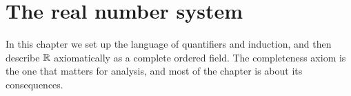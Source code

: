 \section{The real number system}
In this chapter we set up the language of quantifiers and induction, and
then describe $\mathbb{R}$ axiomatically as a complete ordered field. The
completeness axiom is the one that matters for analysis, and most of the
chapter is about its consequences.






